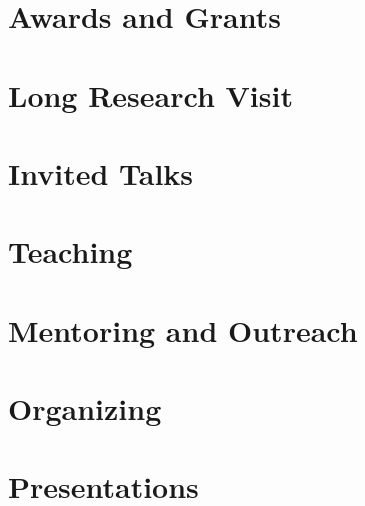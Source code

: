 \documentclass{prometheus_cv}
\begin{document}
\section{Awards and Grants}


\section{Long Research Visit}


\section{Invited Talks}


\section{Teaching}


\section{Mentoring and Outreach}


\section{Organizing}


\section{Presentations}


\end{document}
